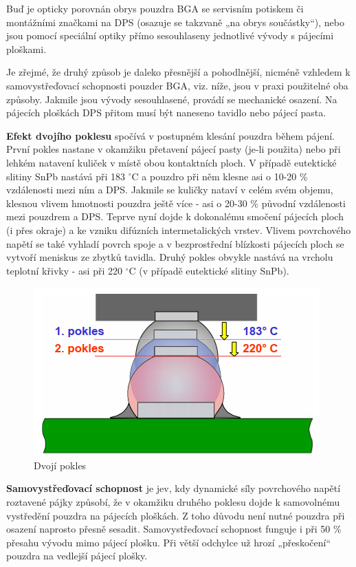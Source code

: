 Buď je opticky porovnán obrys pouzdra BGA se servisním potiskem či montážními značkami na DPS (osazuje se takzvaně „na obrys součástky“), nebo jsou pomocí speciální optiky přímo sesouhlaseny jednotlivé vývody s pájecími ploškami. 

Je zřejmé, že druhý způsob je daleko přesnější a pohodlnější, nicméně vzhledem k samovystřeďovací schopnosti pouzder BGA, viz. níže, jsou v praxi použitelné oba způsoby. Jakmile jsou vývody sesouhlasené, provádí se mechanické osazení. Na pájecích ploškách DPS přitom musí být naneseno tavidlo nebo pájecí pasta.

\textbf{Efekt dvojího poklesu} spočívá v postupném klesání pouzdra během pájení.
První pokles nastane v okamžiku přetavení pájecí pasty (je-li použita) nebo při lehkém natavení kuliček v místě obou kontaktních ploch. V případě eutektické slitiny SnPb nastává při 183 $^{\circ}$C a pouzdro při něm klesne asi o 10-20 \% vzdálenosti mezi ním a DPS. Jakmile se kuličky nataví v celém svém objemu, klesnou vlivem hmotnosti pouzdra ještě více - asi o 20-30 \% původní vzdálenosti mezi pouzdrem a DPS. Teprve nyní dojde k dokonalému smočení pájecích ploch (i přes okraje) a ke vzniku difúzních intermetalických vrstev. Vlivem povrchového napětí se také vyhladí povrch spoje a v bezprostřední blízkosti pájecích ploch se vytvoří meniskus ze zbytků tavidla. Druhý pokles obvykle nastává na vrcholu teplotní křivky - asi při 220 $^{\circ}$C (v případě eutektické slitiny SnPb).

\begin{figure}[h]
   \begin{center}
     \includegraphics[scale=0.6]{images/Pokles.png}
   \end{center}
   \caption{Dvojí pokles}
\end{figure}

\textbf{Samovystřeďovací schopnost} je jev, kdy dynamické síly povrchového napětí
roztavené pájky způsobí, že v okamžiku druhého poklesu dojde k samovolnému vystředění
pouzdra na pájecích ploškách. Z toho důvodu není nutné pouzdra při osazení naprosto přesně sesadit. Samovystřeďovací schopnost funguje i při 50 \% přesahu vývodu mimo pájecí plošku. Při větší odchylce už hrozí „přeskočení“ pouzdra na vedlejší pájecí plošky.

